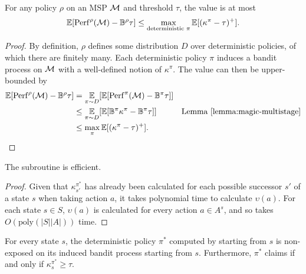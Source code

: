 \begin{lemma}\label{lemma:ms-saup-upper}
	For any policy $\rho$ on an MSP $\mathcal{M}$ and threshold $\tau$, the \SAUP{} value is at most
	\[ \operatorname*{\mathbb{E}}[\mathrm{Perf}^{\rho}(\mathcal{M}) - \mathbb{B}^\rho\tau] \leq \max_{\text{deterministic }\pi}\operatorname*{\mathbb{E}}[(\kappa^\pi - \tau)^+].\]
\end{lemma}

\begin{proof}
	By definition, $\rho$ defines some distribution $D$ over deterministic policies, of which there are finitely many.
	Each deterministic policy $\pi$ induces a bandit process on $\mathcal{M}$ with a well-defined notion of $\kappa^\pi$.
	The \SAUP{} value can then be upper-bounded by
	\begin{align*}
		\operatorname*{\mathbb{E}}[\mathrm{Perf}^{\rho}(\mathcal{M}) - \mathbb{B}^\rho\tau] &= \operatorname*{\mathbb{E}}_{\pi\sim D}[\operatorname*{\mathbb{E}}[\mathrm{Perf}^{\pi}(\mathcal{M}) - \mathbb{B}^\pi\tau]]\\
		&\leq  \operatorname*{\mathbb{E}}_{\pi\sim D}[\operatorname*{\mathbb{E}}[\mathbb{B}^\pi\kappa^\pi - \mathbb{B}^\pi\tau]]& \text{Lemma \ref{lemma:magic-multistage}}\\
		&\leq  \max_\pi \operatorname*{\mathbb{E}}[(\kappa^\pi - \tau)^+].
	\end{align*}
\end{proof}

\begin{lemma}\label{lemma:maxsaup-efficient}
	The \MAXSAUP{} subroutine is efficient.
\end{lemma}

\begin{proof}
	Given that $\kappa_{s'}^{\pi^*}$ has already been calculated for each possible successor $s'$ of a state $s$ when taking action $a$, it takes polynomial time to calculate $\upsilon(a)$.
	For each state $s\in S$, $\upsilon(a)$ is calculated for every action $a\in A^s$, and so \MAXSAUP{} takes $O(\text{poly}(|S||A|))$ time.
\end{proof}

\begin{lemma}\label{lemma:maxsaup-nonexposed}
	For every state $s$, the deterministic policy $\pi^*$ computed by \MAXSAUP{} starting from $s$ is non-exposed on its induced bandit process starting from $s$.
	Furthermore, $\pi^*$ claims if and only if $\kappa^{\pi^*}_s \geq \tau$.
\end{lemma}

